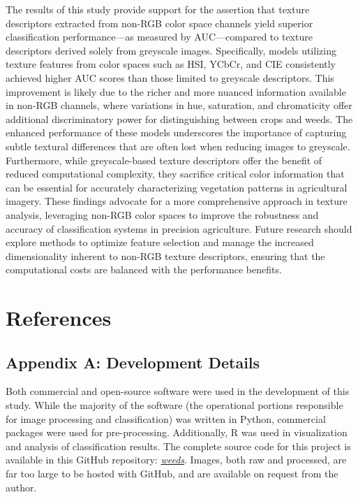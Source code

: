\documentclass[letterpaper]{report}
\begin{document}
The results of this study provide support for the assertion that texture descriptors extracted from non-RGB color space channels yield superior classification performance—as measured by AUC—compared to texture descriptors derived solely from greyscale images. Specifically, models utilizing texture features from color spaces such as HSI, YCbCr, and CIE consistently achieved higher AUC scores than those limited to greyscale descriptors. This improvement is likely due to the richer and more nuanced information available in non-RGB channels, where variations in hue, saturation, and chromaticity offer additional discriminatory power for distinguishing between crops and weeds. The enhanced performance of these models underscores the importance of capturing subtle textural differences that are often lost when reducing images to greyscale. Furthermore, while greyscale-based texture descriptors offer the benefit of reduced computational complexity, they sacrifice critical color information that can be essential for accurately characterizing vegetation patterns in agricultural imagery. These findings advocate for a more comprehensive approach in texture analysis, leveraging non-RGB color spaces to improve the robustness and accuracy of classification systems in precision agriculture. Future research should explore methods to optimize feature selection and manage the increased dimensionality inherent to non-RGB texture descriptors, ensuring that the computational costs are balanced with the performance benefits.

\chapter{References}
\printbibliography[heading=none]
\newpage
\section{Appendix A: Development Details}
Both commercial and open-source software were used in the development of this study. While the majority of the software (the operational portions responsible for image processing and classification) was written in Python, commercial packages were used for pre-processing. Additionally, R was used in visualization and analysis of classification results. The complete source code for this project is available in this GitHub repository: \href{https://github.com/evan-mcginnis/weeds}{\textit {weeds}}. Images, both raw and processed, are far too large to be hosted with GitHub, and are available on request from the author.
\end{document}
